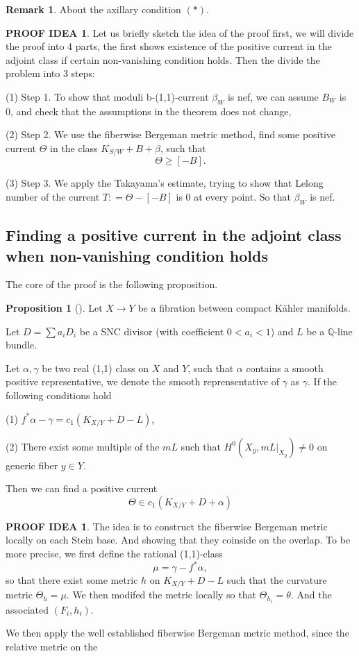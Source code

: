 \documentclass[11pt]{article}
\theoremstyle{definition}
\newtheorem{proposition}[theorem]{Proposition}
\newtheorem{remark}[theorem]{Remark}
\newtheorem{proofidea}[theorem]{PROOF IDEA}
\begin{document}
	\begin{remark}
		About the axillary condition $(*)$. 
	\end{remark}
	\begin{proofidea}
		Let us briefly sketch the idea of the proof first, we will divide the proof into 4 parts, the first shows existence of the positive current in the adjoint class if certain non-vanishing condition holds. Then the divide the problem into 3 steps:
		
		(1) Step 1. To show that moduli b-(1,1)-current $\beta_W$ is nef, we can assume $B_W$ is 0, and check that the assumptions in the theorem does not change,
		
		(2) Step 2. We use the fiberwise Bergeman metric method, find some positive current $\Theta$ in the class $K_{S/W} + B + \beta$, such that $$\Theta \ge [-B].$$
		
		(3) Step 3. We apply the Takayama's estimate, trying to show that Lelong number of the current $T:  = \Theta - [-B]$ is 0 at every point. So that $\beta_W$ is nef. 
		
	\end{proofidea}
	
	\subsection{Finding a positive current in the adjoint class when non-vanishing condition holds}
	The core of the proof is the following proposition.
	\begin{proposition}[{\cite[Theorem 6.2]{HP24}}]
		Let $X\to Y$ be a fibration between compact K\"ahler manifolds.
		
		Let $D= \sum a_i D_i$ be a SNC divisor (with coefficient $0<a_i <1$) and $L$ be a $\mathbb{Q}$-line bundle. 
		
		Let $\alpha ,\gamma$ be two real (1,1) class on $X$ and $Y$, such that $\alpha$ contains a smooth positive representative, we denote the smooth reprensentative of $\gamma$ as $\gamma$. If the following conditions hold
		
		(1) $f^* \alpha - \gamma  = c_1 (K_{X/Y}+D-L)$,
		
		(2) There exist some multiple of the $mL$ such that $H^0(X_y, mL|_{X_y}) \ne 0$ on generic fiber $y\in Y$.
		
		Then we can find a positive current $$\Theta \in c_1(K_{X/Y} + D + \alpha)$$
	\end{proposition}
	\begin{proofidea}
		The idea is to construct the fiberwise Bergeman metric locally on each Stein base. And showing that they coinside on the overlap. To be more precise, we first define the rational (1,1)-class $$\mu = \gamma - f^* \alpha,$$so that there exist some metric $h$ on $K_{X/Y}+D-L$ such that the curvature metric $\Theta_h  = \mu$. We then modifed the metric locally so that $\Theta_{h_i} = \theta$. And the associated $(F_i, h_i)$.
		
		We then apply the well established fiberwise Bergeman metric method, since the relative metric on the 
	\end{proofidea}
	
\end{document}
